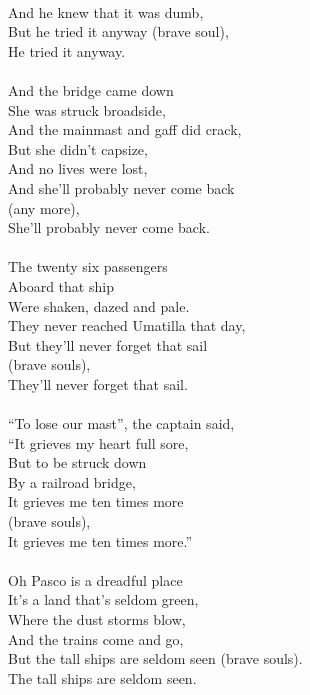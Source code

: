 \documentclass[letterpaper,9pt]{article}
\begin{document}
\\And he knew that it was dumb,
\\But he tried it anyway (brave soul),
\\He tried it anyway.
\\
\\And the bridge came down
\\She was struck broadside,
\\And the mainmast and gaff did crack,
\\But she didn't capsize,
\\And no lives were lost,
\\And she'll probably never come back
\\(any more),
\\She'll probably never come back.
\\
\\The twenty six passengers
\\Aboard that ship
\\Were shaken, dazed and pale.
\\They never reached Umatilla that day,
\\But they'll never forget that sail
\\(brave souls),
\\They'll never forget that sail.
\\
\\“To lose our mast”, the captain said,
\\“It grieves my heart full sore,
\\But to be struck down
\\By a railroad bridge,
\\It grieves me ten times more
\\(brave souls),
\\It grieves me ten times more.”
\\
\\Oh Pasco is a dreadful place
\\It's a land that's seldom green,
\\Where the dust storms blow,
\\And the trains come and go,
\\But the tall ships are seldom seen (brave souls).
\\The tall ships are seldom seen.
\end{document}
